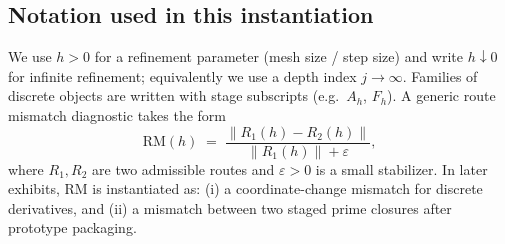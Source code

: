\subsection{Notation used in this instantiation}
We use $h>0$ for a refinement parameter (mesh size / step size) and write $h\downarrow 0$ for infinite refinement; equivalently we use a depth index $j\to\infty$.
Families of discrete objects are written with stage subscripts (e.g.\ $A_h$, $F_h$).
A generic route mismatch diagnostic takes the form
\[
\mathrm{RM}(h)\;=\;\frac{\|R_1(h)-R_2(h)\|}{\|R_1(h)\|+\varepsilon},
\]
where $R_1,R_2$ are two admissible routes and $\varepsilon>0$ is a small stabilizer.
In later exhibits, $\mathrm{RM}$ is instantiated as: (i) a coordinate-change mismatch for discrete derivatives, and (ii) a mismatch between two staged prime closures after prototype packaging.

